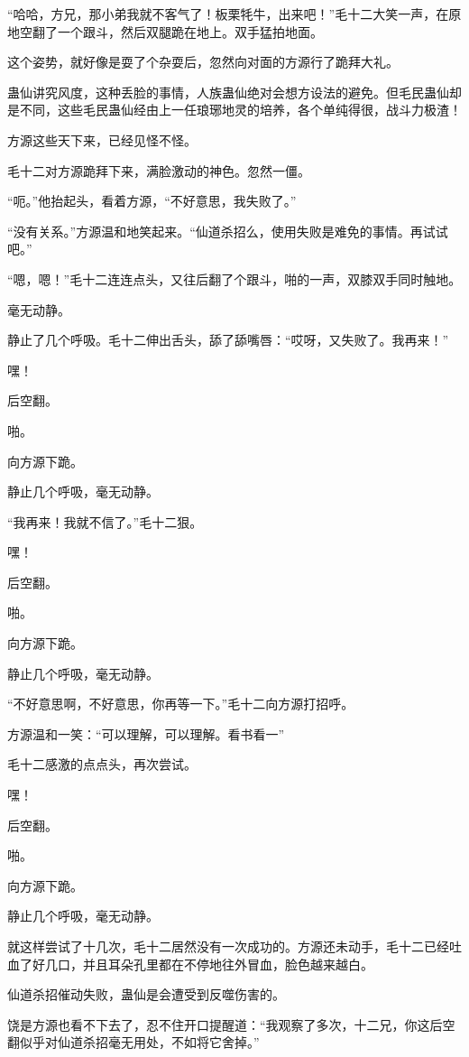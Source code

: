 \begin{this_body}
“哈哈，方兄，那小弟我就不客气了！板栗牦牛，出来吧！”毛十二大笑一声，在原地空翻了一个跟斗，然后双腿跪在地上。双手猛拍地面。

这个姿势，就好像是耍了个杂耍后，忽然向对面的方源行了跪拜大礼。

蛊仙讲究风度，这种丢脸的事情，人族蛊仙绝对会想方设法的避免。但毛民蛊仙却是不同，这些毛民蛊仙经由上一任琅琊地灵的培养，各个单纯得很，战斗力极渣！

方源这些天下来，已经见怪不怪。

毛十二对方源跪拜下来，满脸激动的神色。忽然一僵。

“呃。”他抬起头，看着方源，“不好意思，我失败了。”

“没有关系。”方源温和地笑起来。“仙道杀招么，使用失败是难免的事情。再试试吧。”

“嗯，嗯！”毛十二连连点头，又往后翻了个跟斗，啪的一声，双膝双手同时触地。

毫无动静。

静止了几个呼吸。毛十二伸出舌头，舔了舔嘴唇：“哎呀，又失败了。我再来！”

嘿！

后空翻。

啪。

向方源下跪。

静止几个呼吸，毫无动静。

“我再来！我就不信了。”毛十二狠。

嘿！

后空翻。

啪。

向方源下跪。

静止几个呼吸，毫无动静。

“不好意思啊，不好意思，你再等一下。”毛十二向方源打招呼。

方源温和一笑：“可以理解，可以理解。看书看一”

毛十二感激的点点头，再次尝试。

嘿！

后空翻。

啪。

向方源下跪。

静止几个呼吸，毫无动静。

就这样尝试了十几次，毛十二居然没有一次成功的。方源还未动手，毛十二已经吐血了好几口，并且耳朵孔里都在不停地往外冒血，脸色越来越白。

仙道杀招催动失败，蛊仙是会遭受到反噬伤害的。

饶是方源也看不下去了，忍不住开口提醒道：“我观察了多次，十二兄，你这后空翻似乎对仙道杀招毫无用处，不如将它舍掉。”


\end{this_body}

